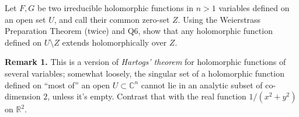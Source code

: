 \documentclass[12pt]{article}  %
\begin{document}
\begin{problem}{7}
Let $F,G$ be two irreducible holomorphic functions in $n>1$ variables defined on an open set $U$, and call their common zero-set $Z$. Using the Weierstrass Preparation Theorem (twice) and Q6, show that any holomorphic function defined on $U\setminus Z$ extends holomorphically over $Z$.

\medskip
\noindent \textbf{Remark 1.} This is a version of \emph{Hartogs' theorem} for holomorphic functions of several variables; somewhat loosely, the singular set of a holomorphic function defined on ``most of'' an open $U \subset \mathbb{C}^n$ cannot lie in an analytic subset of co-dimension $2$, unless it’s empty. Contrast that with the real function $1/(x^2+y^2)$ on $\mathbb{R}^2$.

\end{problem}
\end{document}
